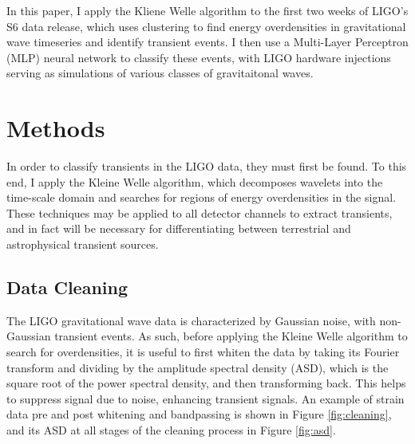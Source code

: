 \documentclass{article}
\begin{document}
In this paper, I apply the Kliene Welle algorithm\citep{Chatterji2004}\citep{Blackburn2007} to the first two weeks of LIGO's S6 data release, which uses clustering to find energy overdensities in gravitational wave timeseries and identify transient events. I then use a Multi-Layer Perceptron (MLP) neural network to classify these events, with LIGO hardware injections serving as simulations of various classes of gravitaitonal waves.

\section{Methods}
In order to classify transients in the LIGO data, they must first be found. To this end, I apply the Kleine Welle algorithm, which decomposes wavelets into the time-scale domain and searches for regions of energy overdensities in the signal\citep{Biswas2013}\cite{Blackburn2007}. These techniques may be applied to all detector channels to extract transients, and in fact will be necessary for differentiating between terrestrial and astrophysical transient sources.

\subsection{Data Cleaning}
The LIGO gravitational wave data is characterized by Gaussian noise, with non-Gaussian transient events. As such, before applying the Kleine Welle algorithm to search for overdensities, it is useful to first whiten the data by taking its Fourier transform and dividing by the amplitude spectral density (ASD), which is the square root of the power spectral density, and then transforming back\citep{LIGOScientificCollaboration}. This helps to suppress signal due to noise, enhancing transient signals. An example of strain data pre and post whitening and bandpassing is shown in Figure \ref{fig:cleaning}, and its ASD at all stages of the cleaning process in Figure \ref{fig:asd}.
\end{document}
